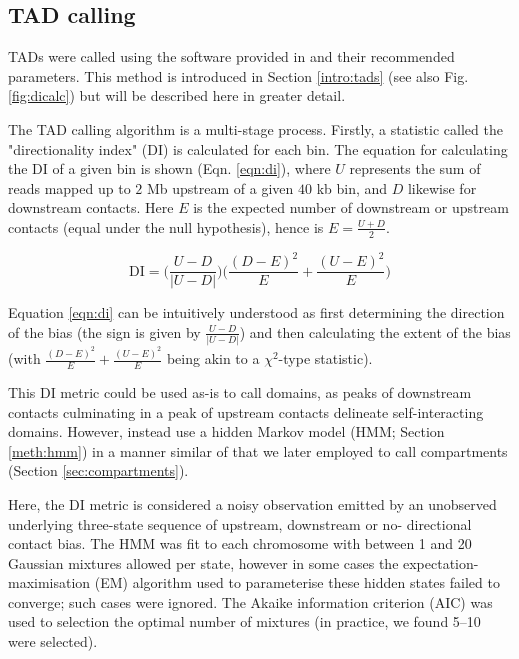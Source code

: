 \documentclass[a4paper,11pt,oneside]{book}
\begin{document}
\subsection{TAD calling}\label{meth:tadcalling}

TADs were called using the software provided in
\citet{Dixon2012} and their recommended parameters. This method is introduced in Section \ref{intro:tads} (see also Fig. \ref{fig:dicalc}) but will be described here in greater detail.

The TAD calling algorithm is a multi-stage process. Firstly, a statistic called the "directionality index" (DI) is calculated for each bin.\cite{Dixon2012} The equation for calculating the DI of a given bin is shown (Eqn. \ref{eqn:di}), where $U$ represents the sum of reads mapped up to $2$ Mb upstream of a given $40$ kb bin, and $D$ likewise for downstream contacts. Here $E$ is the expected number of downstream or upstream contacts (equal under the null hypothesis), hence is $E = \frac{U + D}{2}$. 

\begin{equation}\label{eqn:di}
\mathrm{DI} = \bigg(\frac{U - D}{|U - D|}\bigg)\bigg(\frac{(D - E)^2}{E} + \frac{(U - E)^2}{E}\bigg)
\end{equation}\vspace{.2em}

Equation \ref{eqn:di} can be intuitively understood as first determining the direction of the bias (the sign is given by $\frac{U - D}{|U - D|}$) and then calculating the extent of the bias (with $\frac{(D - E)^2}{E} + \frac{(U - E)^2}{E}$ being akin to a $\chi^2$-type statistic).\cite{Dixon2012}

This DI metric could be used as-is to call domains, as peaks of downstream contacts culminating in a peak of upstream contacts delineate self-interacting domains. However, \citet{Dixon2012} instead use a hidden Markov model (HMM; Section \ref{meth:hmm}) in a manner similar of that we later employed to call compartments (Section \ref{sec:compartments}). 

Here, the DI metric is considered a noisy observation emitted by an unobserved underlying three-state sequence of upstream, downstream or no- directional contact bias.\cite{Dixon2012} The HMM was fit to each chromosome with between 1 and 20 Gaussian mixtures allowed per state, however in some cases the expectation-maximisation (EM) algorithm used to parameterise these hidden states failed to converge; such cases were ignored. The Akaike information criterion (AIC) was used to selection the optimal number of mixtures (in practice, we found 5--10 were selected). 
\end{document}

